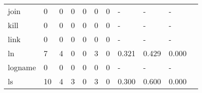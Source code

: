 \begin{longtable}{lp{1.2cm}p{1.2cm}p{1.2cm}p{1.2cm}p{1.2cm}p{1.2cm}p{1.2cm}p{1.2cm}p{1.2cm}p{1.2cm}}
join      &                                     0 &                                                  0 &                                                0 &                                               0 &                                                0 &                                              0 &                                                  - &                                                  - &                                                  - \\
kill      &                                     0 &                                                  0 &                                                0 &                                               0 &                                                0 &                                              0 &                                                  - &                                                  - &                                                  - \\
link      &                                     0 &                                                  0 &                                                0 &                                               0 &                                                0 &                                              0 &                                                  - &                                                  - &                                                  - \\
ln        &                                     7 &                                                  4 &                                                0 &                                               0 &                                                3 &                                              0 &                                              0.321 &                                              0.429 &                                              0.000 \\
logname   &                                     0 &                                                  0 &                                                0 &                                               0 &                                                0 &                                              0 &                                                  - &                                                  - &                                                  - \\
ls        &                                    10 &                                                  4 &                                                3 &                                               0 &                                                3 &                                              0 &                                              0.300 &                                              0.600 &                                              0.000 \\

\end{longtable}
